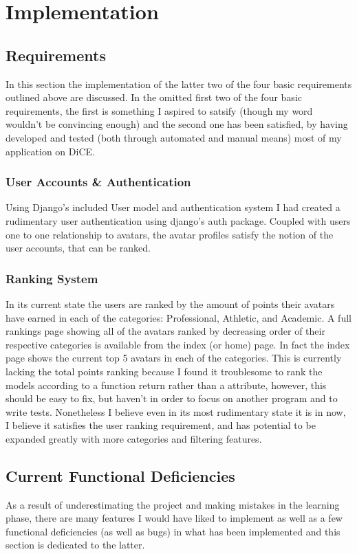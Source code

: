 \documentclass[11pt,a4paper]{article}
\begin{document}
\section{Implementation}
\subsection{Requirements}
In this section the implementation of the latter two of the four basic requirements outlined above are discussed. In the omitted first two of the four basic requirements, the first is something I aspired to satsify (though my word wouldn't be convincing enough) and the second one has been satisfied, by having developed and tested (both through automated and manual means) most of my application on DiCE.

\subsubsection{User Accounts \& Authentication}
Using Django's included User model and authentication system I had created a rudimentary user authentication using django's auth package. Coupled with users one to one relationship to avatars, the avatar profiles satisfy the notion of the user accounts, that can be ranked.

\subsubsection{Ranking System}
In its current state the users are ranked by the amount of points their avatars have earned in each of the categories: Professional, Athletic, and Academic. A full rankings page showing all of the avatars ranked by decreasing order of their respective categories is available from the index (or home) page. In fact the index page shows the current top 5 avatars in each of the categories. This is currently lacking the total points ranking because I found it troublesome to rank the models according to a function return rather than a attribute, however, this should be easy to fix, but haven't in order to focus on another program and to write tests. Nonetheless I believe even in its most rudimentary state it is in now, I believe it satisfies the user ranking requirement, and has potential to be expanded greatly with more categories and filtering features.

\subsection{Current Functional Deficiencies}
As a result of underestimating the project and making mistakes in the learning phase, there are many features I would have liked to implement as well as a few functional deficiencies (as well as bugs) in what has been implemented and this section is dedicated to the latter.
\end{document}

